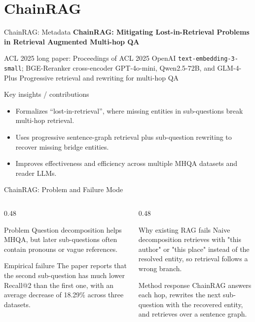 \section{ChainRAG}

\begin{frame}{ChainRAG: Metadata}
\small
\textbf{ChainRAG: Mitigating Lost-in-Retrieval Problems in Retrieval Augmented Multi-hop QA}

\paperinfo
{ACL 2025 long paper: Proceedings of ACL 2025}
{OpenAI \texttt{text-embedding-3-small}; BGE-Reranker cross-encoder}
{GPT-4o-mini, Qwen2.5-72B, and GLM-4-Plus}
{Progressive retrieval and rewriting for multi-hop QA}

\begin{block}{Key insights / contributions}
\scriptsize
\begin{itemize}
  \item Formalizes ``lost-in-retrieval'', where missing entities in sub-questions break multi-hop retrieval.
  \item Uses progressive sentence-graph retrieval plus sub-question rewriting to recover missing bridge entities.
  \item Improves effectiveness and efficiency across multiple MHQA datasets and reader LLMs.
\end{itemize}
\end{block}
\end{frame}

\begin{frame}{ChainRAG: Problem and Failure Mode}
\scriptsize
\begin{columns}[T,onlytextwidth]
  \begin{column}{0.48\textwidth}
    \begin{block}{Problem}
      Question decomposition helps MHQA, but later sub-questions often contain pronouns or vague references.
    \end{block}
    \begin{block}{Empirical failure}
      The paper reports that the second sub-question has much lower Recall@2 than the first one, with an average decrease of 18.29\% across three datasets.
    \end{block}
  \end{column}
  \begin{column}{0.48\textwidth}
    \begin{block}{Why existing RAG fails}
      Naive decomposition retrieves with "this author" or "this place" instead of the resolved entity, so retrieval follows a wrong branch.
    \end{block}
    \begin{block}{Method response}
      ChainRAG answers each hop, rewrites the next sub-question with the recovered entity, and retrieves over a sentence graph.
    \end{block}
  \end{column}
\end{columns}
\end{frame}

